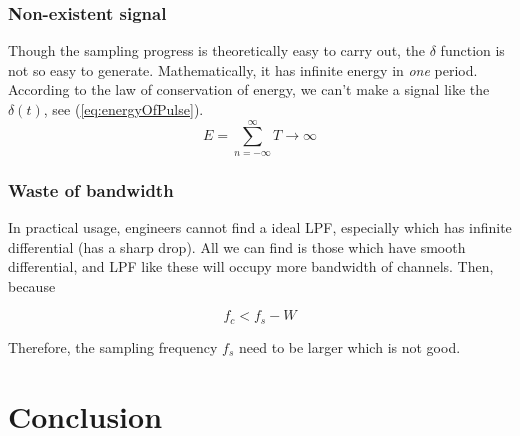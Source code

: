 \documentclass{article}
\begin{document}
\subsubsection*{Non-existent signal}
Though the sampling progress is theoretically easy to carry out, the $\delta$ function is not so easy to generate. Mathematically, it has infinite energy in \emph{one} period. According to the law of conservation of energy, we can't make a signal like the $\delta(t)$, see (\ref{eq:energyOfPulse}).
\begin{equation}
E = \sum_{n = -\infty}^{\infty} T \to \infty
\label{eq:energyOfPulse}
\end{equation}

\subsubsection*{Waste of bandwidth}
In practical usage, engineers cannot find a ideal LPF, especially which has infinite differential (has a sharp drop). All we can find is those which have smooth differential, and LPF like these will occupy more bandwidth of channels. Then, because

$$
f_c < f_s - W
$$

Therefore, the sampling frequency $f_s$ need to be larger which is not good.



\section{Conclusion}






\begin{appendices}

\end{appendices}
\end{document}
